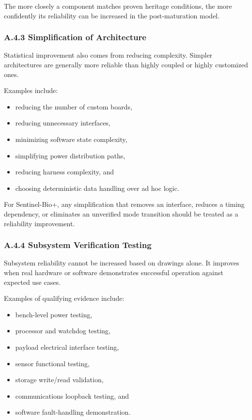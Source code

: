 \documentclass[11pt]{article}
\begin{document}
The more closely a component matches proven heritage conditions, the more confidently its reliability
can be increased in the post-maturation model.

\subsubsection*{A.4.3 Simplification of Architecture}

Statistical improvement also comes from reducing complexity. Simpler architectures are generally
more reliable than highly coupled or highly customized ones.

Examples include:

\begin{itemize}
    \item reducing the number of custom boards,
    \item reducing unnecessary interfaces,
    \item minimizing software state complexity,
    \item simplifying power distribution paths,
    \item reducing harness complexity, and
    \item choosing deterministic data handling over ad hoc logic.
\end{itemize}

For Sentinel-Bio+, any simplification that removes an interface, reduces a timing dependency, or
eliminates an unverified mode transition should be treated as a reliability improvement.

\subsubsection*{A.4.4 Subsystem Verification Testing}

Subsystem reliability cannot be increased based on drawings alone. It improves when real hardware
or software demonstrates successful operation against expected use cases.

Examples of qualifying evidence include:

\begin{itemize}
    \item bench-level power testing,
    \item processor and watchdog testing,
    \item payload electrical interface testing,
    \item sensor functional testing,
    \item storage write/read validation,
    \item communications loopback testing, and
    \item software fault-handling demonstration.
\end{itemize}
\end{document}
